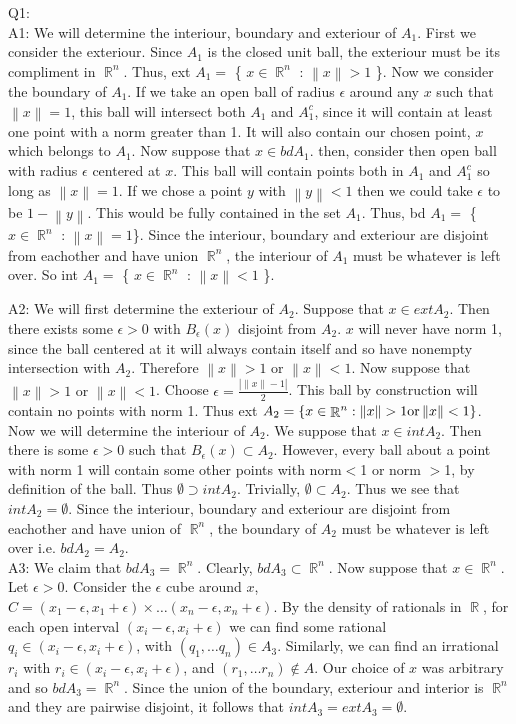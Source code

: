 \documentclass[letterpaper]{article}
\DeclareMathOperator{\R}{\mathbb{R}}
\newcommand{\norm}[1]{\left\lVert#1\right\rVert}
\begin{document}
Q1: 
\\A1: We will determine the interiour, boundary and exteriour of $A_1$. First we consider the exteriour. Since $A_1$ is the closed unit ball, the exteriour must be its compliment in $\R^n$. Thus, ext $A_1 = $ \{ $x \in \R^n$ : $\norm{x} >1$ \}.
Now we consider the boundary of $A_1$.  If we take an open ball of radius $\epsilon$ around any $x$ such that $\norm{x} =1$, this ball will intersect both $A_1$ and $A_1^c$, since it will contain at least one point with a norm greater than 1. It will also contain our chosen point, $x$ which belongs to $A_1$. Now suppose that $x\in bd A_1$. then, consider then open ball with radius $\epsilon$ centered at $x$. This ball will contain points both in $A_1$ and $A_1^c$ so long as $\norm{x}=1$. If we chose a point $y$ with $\norm{y}<1$ then we could take $\epsilon$ to be $1-\norm{y}$. This would be fully contained in the set $A_1$. Thus, bd $A_1=$ \{ $x\in \R^n$ : $ \norm{x} = 1 $\}. 
Since the interiour, boundary and exteriour are disjoint from eachother and have union $\R^n$, the interiour of $A_1$ must be whatever is left over. So int $A_1=$ \{ $x \in \R^n$ : $\norm{x} <1$ \}. 

A2: We will first determine the exteriour of $A_2$. Suppose that $x\in ext A_2$. Then there exists some $\epsilon >0$ with $B_{\epsilon}(x)$ disjoint from $A_2$. $x$ will never have norm 1, since the ball centered at it will always contain itself and so have nonempty intersection with $A_2$. Therefore $\norm{x}>1 \text{ or } \norm{x} <1$. Now suppose that $\norm{x} >1 \text{ or } \norm{x} <1$. Choose $\epsilon = \frac{|\norm{x}-1|}{2}$. This ball by construction will contain no points with norm 1. Thus ext $A_2 = \{ x \in \R^n : \norm{x} >1 \space \text{or} \space \norm{x} <1  \}$. 
Now we will determine the interiour of $A_2$. We suppose that $x\in int A_2$. Then there is some $\epsilon >0$ such that $B_{\epsilon} (x) \subset A_2$. However, every ball about a point with norm 1 will contain some other points with norm$<$1 or norm $>$1, by definition of the ball. Thus $\emptyset \supset int A_2$. Trivially, $\emptyset \subset A_2$. Thus we see that $int A_2 = \emptyset$. Since the interiour, boundary and exteriour are disjoint from eachother and have union of $\R^n$, the boundary of $A_2$ must be whatever is left over i.e. $bd A_2 = A_2$. 
\\
A3: We claim that $bd A_3 = \R^n$.  Clearly, $bd A_3 \subset \R^n$. Now suppose that $x\in \R^n$. Let $\epsilon >0$. Consider the $\epsilon$ cube around $x$, $C= (x_1-\epsilon,x_1+\epsilon) \times \dots (x_n - \epsilon,x_n + \epsilon)$. By the density of rationals in $\R$, for each open interval $(x_i-\epsilon, x_i + \epsilon )$ we can find some rational $q_i\in (x_i-\epsilon, x_i + \epsilon )$, with $(q_1, \dots q_n) \in A_3$. Similarly, we can find an irrational $r_i$ with $r_i\in (x_i-\epsilon, x_i + \epsilon )$, and $(r_1, \dots r_n) \notin A$. Our choice of $x$ was arbitrary and so $bd A_3 = \R^n$. Since the union of the boundary, exteriour and interior is $\R^n$ and they are pairwise disjoint, it follows that $int A_3 = ext A_3 = \emptyset$.
\end{document}
